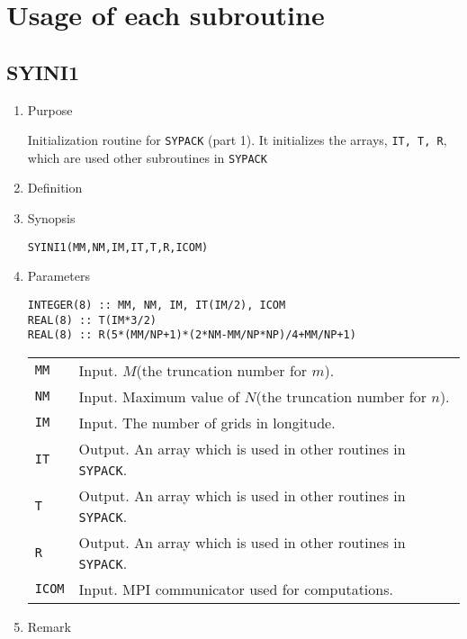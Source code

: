 \documentclass[a4paper]{scrartcl}
\begin{document}

\section{Usage of each subroutine}

\subsection{SYINI1}

\begin{enumerate}

\item Purpose

Initialization routine for \texttt{SYPACK} (part 1).
It initializes the arrays, \texttt{IT, T, R},
which are used other subroutines in \texttt{SYPACK}
  
\item Definition

\item Synopsis 
    
\texttt{SYINI1(MM,NM,IM,IT,T,R,ICOM)}
  
\item Parameters

\begin{verbatim}  
INTEGER(8) :: MM, NM, IM, IT(IM/2), ICOM
REAL(8) :: T(IM*3/2)
REAL(8) :: R(5*(MM/NP+1)*(2*NM-MM/NP*NP)/4+MM/NP+1)
\end{verbatim}  
    
\begin{tabular}{ll}
\texttt{MM} & Input. $M$(the truncation number for $m$).\\
\texttt{NM} & Input. Maximum value of $N$(the truncation 
  number for $n$).\\
\texttt{IM}  & Input. The number of grids in longitude.\\
\texttt{IT}  & Output. An array which is used in other routines in \texttt{SYPACK}.\\
\texttt{T}   & Output. An array which is used in other routines in \texttt{SYPACK}.\\
\texttt{R}  & Output. An array which is used in other routines in
\texttt{SYPACK}.\\
\texttt{ICOM} & Input. MPI communicator used for computations.
\end{tabular}

\item Remark


\end{enumerate}
\end{document}
